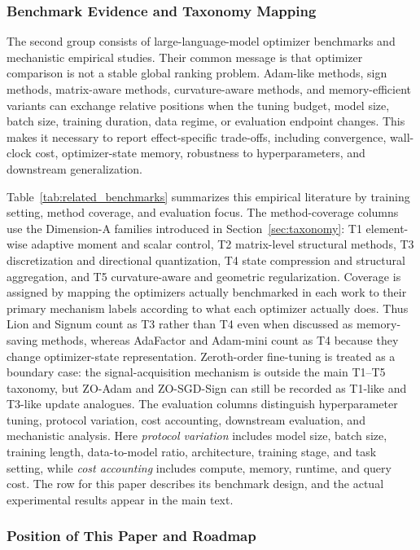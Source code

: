 \subsubsection{Benchmark Evidence and Taxonomy Mapping}

The second group consists of large-language-model optimizer benchmarks and
mechanistic empirical studies.  Their common message is that optimizer
comparison is not a stable global ranking problem.  Adam-like methods, sign
methods, matrix-aware methods, curvature-aware methods, and memory-efficient
variants can exchange relative positions when the tuning budget, model size,
batch size, training duration, data regime, or evaluation endpoint changes.
This makes it necessary to report effect-specific trade-offs, including
convergence, wall-clock cost, optimizer-state memory, robustness to
hyperparameters, and downstream generalization.

Table~\ref{tab:related_benchmarks} summarizes this empirical literature by
training setting, method coverage, and evaluation focus.  The method-coverage
columns use the Dimension-A families introduced in
Section~\ref{sec:taxonomy}: T1 element-wise adaptive moment and scalar control,
T2 matrix-level structural methods, T3 discretization and directional
quantization, T4 state compression and structural aggregation, and T5
curvature-aware and geometric regularization.  Coverage is assigned by mapping the
optimizers actually benchmarked in each work to their primary mechanism labels
according to what each optimizer actually does.  Thus Lion and Signum
count as T3 rather than T4 even when discussed as memory-saving methods, whereas
AdaFactor and Adam-mini count as T4 because they change optimizer-state
representation.  Zeroth-order fine-tuning is treated as a boundary case: the
signal-acquisition mechanism is outside the main T1--T5 taxonomy, but ZO-Adam
and ZO-SGD-Sign can still be recorded as T1-like and T3-like update analogues.
The evaluation columns distinguish hyperparameter tuning, protocol variation,
cost accounting, downstream evaluation, and mechanistic analysis.  Here
\emph{protocol variation} includes model size, batch size, training length,
data-to-model ratio, architecture, training stage, and task setting, while
\emph{cost accounting} includes compute, memory, runtime, and query cost.  The
row for this paper describes its benchmark design, and the actual experimental
results appear in the main text.


\subsubsection{Position of This Paper and Roadmap}

